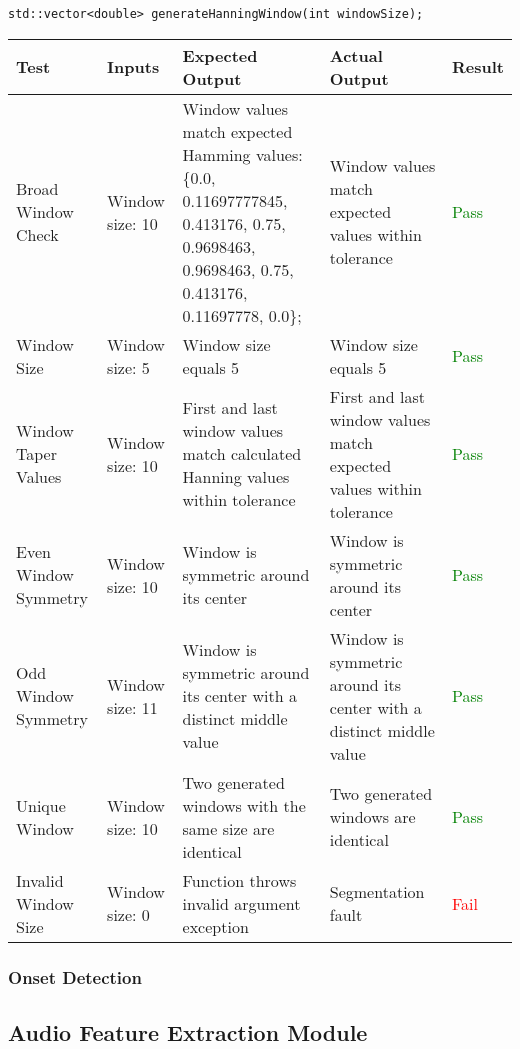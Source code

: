 \documentclass[12pt, titlepage]{article}
\begin{document}
\noindent\texttt{std::vector<double> generateHanningWindow(int windowSize);}\\
\begin{longtable}{|L{3cm}|L{3cm}|L{2.5cm}|L{2.5cm}|l|}
  \hline
  \textbf{Test} & \textbf{Inputs} & \textbf{Expected Output} & \textbf{Actual Output} & \textbf{Result} \\
  \hline
  Broad Window Check &
    Window size: 10 &
    Window values match expected Hamming values: \{0.0, 0.11697777845, 0.413176, 0.75, 0.9698463, 
    0.9698463, 0.75, 0.413176, 0.11697778, 0.0\}; &
    Window values match expected values within tolerance &
    \textcolor{green}{Pass} \\
  \hline
  Window Size &
    Window size: 5 &
    Window size equals 5 &
    Window size equals 5 &
    \textcolor{green}{Pass} \\
  \hline
  Window Taper Values &
    Window size: 10 &
    First and last window values match calculated Hanning values within tolerance &
    First and last window values match expected values within tolerance &
    \textcolor{green}{Pass} \\
  \hline
  Even Window Symmetry &
    Window size: 10 &
    Window is symmetric around its center &
    Window is symmetric around its center &
    \textcolor{green}{Pass} \\
  \hline
  Odd Window Symmetry &
    Window size: 11 &
    Window is symmetric around its center with a distinct middle value &
    Window is symmetric around its center with a distinct middle value &
    \textcolor{green}{Pass} \\
  \hline
  Unique Window &
    Window size: 10 &
    Two generated windows with the same size are identical &
    Two generated windows are identical &
    \textcolor{green}{Pass} \\
  \hline
  Invalid Window Size &
    Window size: 0 &
    Function throws invalid argument exception &
    Segmentation fault &
    \textcolor{red}{Fail} \\
  \hline
\end{longtable}

\subsubsection{Onset Detection}


\subsection{Audio Feature Extraction Module}
\end{document}
